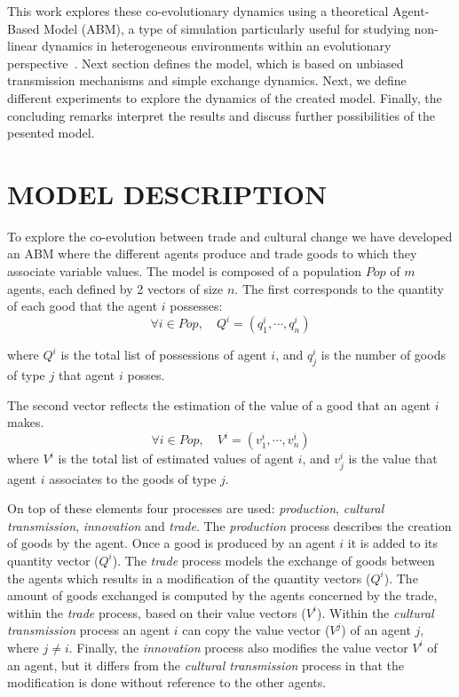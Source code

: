 \documentclass{wscpaperproc}
\begin{document}
This work explores these co-evolutionary dynamics using a theoretical Agent-Based Model (ABM), a type of simulation particularly useful for studying non-linear dynamics in heterogeneous environments within an evolutionary perspective~\cite{lake_trends_2014}. Next section defines the model, which is based on unbiased transmission mechanisms and simple exchange dynamics. Next, we define different experiments to explore the dynamics of the created model. Finally, the concluding remarks interpret the results and discuss further possibilities of the pesented model.

\section{MODEL DESCRIPTION}

To explore the co-evolution between trade and cultural change we have developed an ABM where the different agents produce and trade goods to which they associate variable values. The model is composed of a population $Pop$ of $m$ agents, each defined by 2 vectors of size $n$. The first corresponds to the quantity of each good that the agent $i$ possesses: 
$$\forall i \in Pop, \quad Q^i = (q^i_1,\cdots,q^i_n) $$

where $Q^i$ is the total list of possessions of agent $i$, and $q^i_j$ is the number of goods of type $j$ that agent $i$ posses.

The second vector reflects the estimation of the value of a good that an agent $i$ makes.
$$\forall i \in Pop, \quad V^i = (v^i_1,\cdots,v^i_n) $$
where $V^i$ is the total list of estimated values of agent $i$, and $v^i_j$ is the value that agent $i$ associates to the goods of type $j$.

On top of these elements four processes are used: \emph{production}, \emph{cultural transmission}, \emph{innovation} and \emph{trade}. The \emph{production} process describes the creation of goods by the agent. Once a good is produced by an agent $i$ it is added to its quantity vector ($Q^i$). The \emph{trade} process models the exchange of goods between the agents which results in a modification of the quantity vectors ($Q^i$). The amount of goods exchanged is computed by the agents concerned by the trade, within the \emph{trade} process, based on their value vectors ($V^i$). Within the \emph{cultural transmission} process an agent $i$ can copy the value vector ($V^j$) of an agent $j$, where $j \neq i$. Finally, the \textit{innovation} process also modifies the value vector $V^i$ of an agent, but it differs from the \emph{cultural transmission} process in that the modification is done without reference to the other agents.
\end{document}
